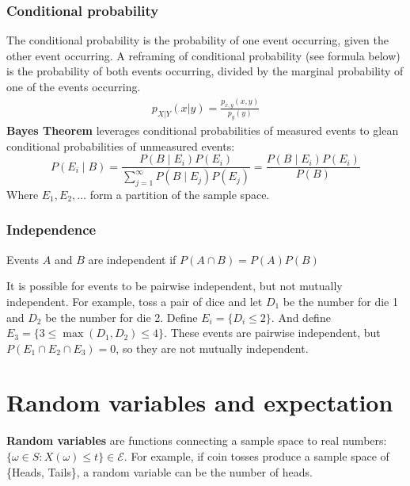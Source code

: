 \documentclass{article}
\begin{document}
\subsubsection{Conditional probability}
The conditional probability is the probability of one event occurring, given the other event occurring. A reframing of conditional probability (see formula below) is the probability of both events occurring, divided by the marginal probability of one of the events occurring. 
\begin{align*}
    p_{X|Y}(x|y) = \frac{p_{x,y}(x,y)}{p_y(y)}
\end{align*}
\textbf{Bayes Theorem} leverages conditional probabilities of measured events to glean conditional probabilities of unmeasured events:
\begin{equation*}
    P(E_i \mid B) = \frac{P(B \mid E_i)P(E_i)}{\sum_{j=1}^\infty P(B \mid E_j)P(E_j)} = \frac{P(B \mid E_i)P(E_i)}{P(B)}
\end{equation*}
Where $E_1, E_2, \dots$ form a partition of the sample space.

\subsubsection{Independence}
Events $A$ and $B$ are independent if $P(A\cap B) = P(A)P(B)$

It is possible for events to be pairwise independent, but not mutually independent. For example, toss a pair of dice and let $D_1$ be the number for die 1 and $D_2$ be the number for die 2. Define $E_i = \{D_i \leq 2\}$. And define $E_3 = \{ 3 \leq \max(D_1, D_2) \leq 4 \}$. These events are pairwise independent, but $P(E_1\cap E_2 \cap E_3) = 0$, so they are not mutually independent. 

\section{Random variables and expectation}
\textbf{Random variables} are functions connecting a sample space to real numbers: $\{ \omega \in S : X(\omega) \leq t \} \in \mathcal{E}$. 
For example, if coin tosses produce a sample space of \{Heads, Tails\}, a random variable can be the number of heads. 

\end{document}
